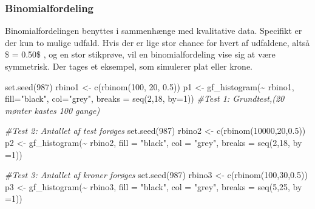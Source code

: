 \documentclass[
]{article}
\newenvironment{Shaded}{\begin{snugshade}}{\end{snugshade}}
\newcommand{\AttributeTok}[1]{\textcolor[rgb]{0.77,0.63,0.00}{#1}}
\newcommand{\CommentTok}[1]{\textcolor[rgb]{0.56,0.35,0.01}{\textit{#1}}}
\newcommand{\DecValTok}[1]{\textcolor[rgb]{0.00,0.00,0.81}{#1}}
\newcommand{\FloatTok}[1]{\textcolor[rgb]{0.00,0.00,0.81}{#1}}
\newcommand{\FunctionTok}[1]{\textcolor[rgb]{0.00,0.00,0.00}{#1}}
\newcommand{\NormalTok}[1]{#1}
\newcommand{\OtherTok}[1]{\textcolor[rgb]{0.56,0.35,0.01}{#1}}
\newcommand{\SpecialCharTok}[1]{\textcolor[rgb]{0.00,0.00,0.00}{#1}}
\newcommand{\StringTok}[1]{\textcolor[rgb]{0.31,0.60,0.02}{#1}}
\begin{document}
\hypertarget{binomialfordeling}{%
\subsubsection{Binomialfordeling}\label{binomialfordeling}}

Binomialfordelingen benyttes i sammenhænge med kvalitative data.
Specifikt er der kun to mulige udfald. Hvis der er lige stor chance for
hvert af udfaldene, altså \$ \pi = 0.50\$ , og en stor stikprøve, vil en
binomialfordeling vise sig at være symmetrisk. Der tages et eksempel,
som simulerer plat eller krone.

\begin{Shaded}
\begin{Highlighting}[]
\FunctionTok{set.seed}\NormalTok{(}\DecValTok{987}\NormalTok{)}
\NormalTok{rbino1 }\OtherTok{\textless{}{-}} \FunctionTok{c}\NormalTok{(}\FunctionTok{rbinom}\NormalTok{(}\DecValTok{100}\NormalTok{, }\DecValTok{20}\NormalTok{, }\FloatTok{0.5}\NormalTok{))}
\NormalTok{p1 }\OtherTok{\textless{}{-}} \FunctionTok{gf\_histogram}\NormalTok{(}\SpecialCharTok{\textasciitilde{}}\NormalTok{ rbino1, }\AttributeTok{fill=}\StringTok{"black"}\NormalTok{, }\AttributeTok{col=}\StringTok{"grey"}\NormalTok{, }\AttributeTok{breaks =} \FunctionTok{seq}\NormalTok{(}\DecValTok{2}\NormalTok{,}\DecValTok{18}\NormalTok{, }\AttributeTok{by=}\DecValTok{1}\NormalTok{)) }\CommentTok{\#Test 1: Grundtest,(20 mønter kastes 100 gange)}


\CommentTok{\#Test 2: Antallet af test forøges}
\FunctionTok{set.seed}\NormalTok{(}\DecValTok{987}\NormalTok{)}
\NormalTok{rbino2 }\OtherTok{\textless{}{-}} \FunctionTok{c}\NormalTok{(}\FunctionTok{rbinom}\NormalTok{(}\DecValTok{10000}\NormalTok{,}\DecValTok{20}\NormalTok{,}\FloatTok{0.5}\NormalTok{))}
\NormalTok{p2 }\OtherTok{\textless{}{-}} \FunctionTok{gf\_histogram}\NormalTok{(}\SpecialCharTok{\textasciitilde{}}\NormalTok{ rbino2, }\AttributeTok{fill =} \StringTok{"black"}\NormalTok{, }\AttributeTok{col =} \StringTok{"grey"}\NormalTok{, }\AttributeTok{breaks =} \FunctionTok{seq}\NormalTok{(}\DecValTok{2}\NormalTok{,}\DecValTok{18}\NormalTok{, }\AttributeTok{by =}\DecValTok{1}\NormalTok{)) }

\CommentTok{\#Test 3: Antallet af kroner forøges}
\FunctionTok{set.seed}\NormalTok{(}\DecValTok{987}\NormalTok{)}
\NormalTok{rbino3 }\OtherTok{\textless{}{-}} \FunctionTok{c}\NormalTok{(}\FunctionTok{rbinom}\NormalTok{(}\DecValTok{100}\NormalTok{,}\DecValTok{30}\NormalTok{,}\FloatTok{0.5}\NormalTok{))}
\NormalTok{p3 }\OtherTok{\textless{}{-}} \FunctionTok{gf\_histogram}\NormalTok{(}\SpecialCharTok{\textasciitilde{}}\NormalTok{ rbino3, }\AttributeTok{fill =} \StringTok{"black"}\NormalTok{, }\AttributeTok{col =} \StringTok{"grey"}\NormalTok{, }\AttributeTok{breaks =} \FunctionTok{seq}\NormalTok{(}\DecValTok{5}\NormalTok{,}\DecValTok{25}\NormalTok{, }\AttributeTok{by =}\DecValTok{1}\NormalTok{)) }


\end{Highlighting}
\end{Shaded}
\end{document}
